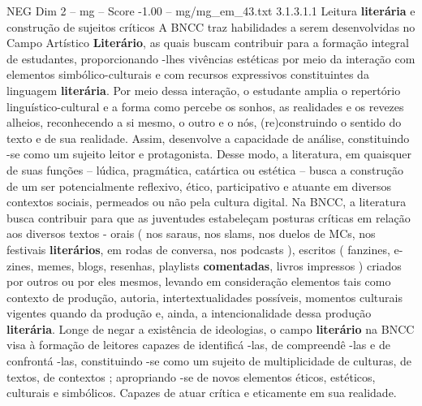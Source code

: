 \begin{textsample}{NEG Dim 2 – mg – Score -1.00 – mg/mg\_em\_43.txt}  \label{ex:f2_neg_100}
3.1.3.1.1 Leitura \textbf{literária} e construção de sujeitos críticos A BNCC traz habilidades a serem desenvolvidas no Campo Artístico \textbf{Literário}, as quais buscam contribuir para a formação integral de estudantes, proporcionando -lhes vivências estéticas por meio da interação com elementos simbólico-culturais e com recursos expressivos constituintes da linguagem \textbf{literária}.
Por meio dessa interação, o estudante amplia o repertório linguístico-cultural e a forma como percebe os sonhos, as realidades e os revezes alheios, reconhecendo a si mesmo, o outro e o nós, (re)construindo o sentido do texto e de sua realidade.
Assim, desenvolve a capacidade de análise, constituindo -se como um sujeito leitor e protagonista.
Desse modo, a literatura, em quaisquer de suas funções – lúdica, pragmática, catártica ou estética – busca a construção de um ser potencialmente reflexivo, ético, participativo e atuante em diversos contextos sociais, permeados ou não pela cultura digital.
Na BNCC, a literatura busca contribuir para que as juventudes estabeleçam posturas críticas em relação aos diversos textos - orais ( nos saraus, nos slams, nos duelos de MCs, nos festivais \textbf{literários}, em rodas de conversa, nos podcasts ), escritos ( fanzines, e-zines, memes, blogs, resenhas, playlists \textbf{comentadas}, livros impressos ) criados por outros ou por eles mesmos, levando em consideração elementos tais como contexto de produção, autoria, intertextualidades possíveis, momentos culturais vigentes quando da produção e, ainda, a intencionalidade dessa produção \textbf{literária}.
Longe de negar a existência de ideologias, o campo \textbf{literário} na BNCC visa à formação de leitores capazes de identificá -las, de compreendê -las e de confrontá -las, constituindo -se como um sujeito de multiplicidade de culturas, de textos, de contextos ; apropriando -se de novos elementos éticos, estéticos, culturais e simbólicos.
Capazes de atuar crítica e eticamente em sua realidade.

\end{textsample}
